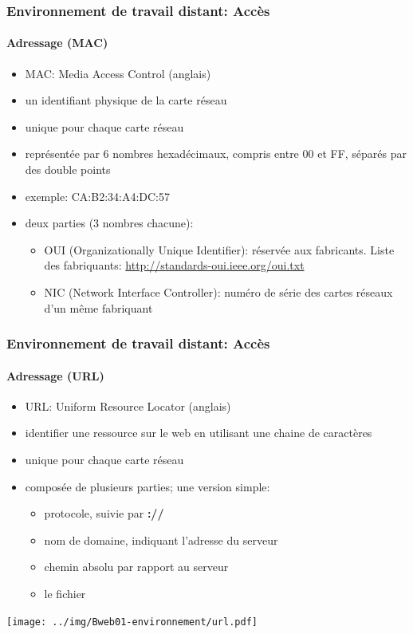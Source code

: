 \documentclass{beamer}
\begin{document}
\begin{frame}
\frametitle{Environnement de travail distant: Accès}
\framesubtitle{Adressage (MAC)}

\begin{itemize}
	\item MAC: Media Access Control (anglais)
	\item un identifiant physique de la carte réseau 
	\item unique pour chaque carte réseau  
	\item représentée par 6 nombres hexadécimaux, compris entre 00 et FF, séparés par des double points
	\item exemple: CA:B2:34:A4:DC:57
	\item deux parties (3 nombres chacune): 
	\begin{itemize}
		\item OUI (Organizationally Unique Identifier): réservée aux fabricants. 
		Liste des fabriquants: \url{http://standards-oui.ieee.org/oui.txt}
		\item NIC (Network Interface Controller): numéro de série des cartes réseaux d'un même fabriquant
	\end{itemize}
\end{itemize}

\end{frame}

\begin{frame}
\frametitle{Environnement de travail distant: Accès}
\framesubtitle{Adressage (URL)}

\begin{itemize}
	\item URL: Uniform Resource Locator (anglais)
	\item identifier une ressource sur le web en utilisant une chaine de caractères
	\item unique pour chaque carte réseau  
	\item composée de plusieurs parties; une version simple: 
	\begin{itemize}
		\item protocole, suivie par \textbf{://}
		\item nom de domaine, indiquant l'adresse du serveur
		\item chemin absolu par rapport au serveur 
		\item le fichier 
	\end{itemize}
\end{itemize}

\texttt{[image: ../img/Bweb01-environnement/url.pdf]}

\end{frame}
\end{document}
